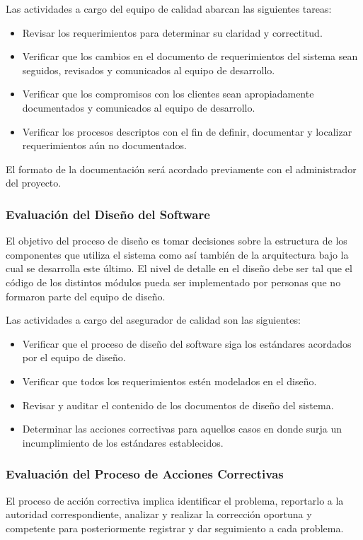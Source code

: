 \documentclass[a4paper,10pt]{article}
\begin{document}
	Las actividades a cargo del equipo de calidad abarcan las siguientes tareas:
	\begin{itemize}
		\item Revisar los requerimientos para determinar su claridad y correctitud.
		\item Verificar que los cambios en el documento de requerimientos del sistema sean seguidos, revisados y comunicados al equipo de desarrollo.
		\item Verificar que los compromisos con los clientes sean apropiadamente documentados y comunicados al equipo de desarrollo.
		\item Verificar los procesos descriptos con el fin de definir, documentar y localizar requerimientos aún no documentados.
	\end{itemize}
	
	El formato de la documentación será acordado previamente con el administrador del proyecto.

	
	\subsubsection{Evaluación del Diseño del Software}
	El objetivo del proceso de diseño es tomar decisiones sobre la estructura de los componentes que utiliza el sistema como así también de la arquitectura bajo la cual se desarrolla este último. El nivel de detalle en el diseño debe ser tal que el código de los distintos módulos pueda ser implementado por personas que no formaron parte del equipo de diseño.
	
	Las actividades a cargo del asegurador de calidad son las siguientes:
	\begin{itemize}
		\item Verificar que el proceso de diseño del software siga los estándares acordados por el equipo de diseño.
		\item Verificar que todos los requerimientos estén modelados en el diseño.
		\item Revisar y auditar el contenido de los documentos de diseño del sistema.
		\item Determinar las acciones correctivas para aquellos casos en donde surja un incumplimiento de los estándares establecidos.
	\end{itemize}
	
	\subsubsection{Evaluación del Proceso de Acciones Correctivas}
	El proceso de acción correctiva implica identificar el problema, reportarlo a la autoridad correspondiente, analizar y realizar la corrección oportuna y competente para posteriormente registrar y dar seguimiento a cada problema.
	
\end{document}
